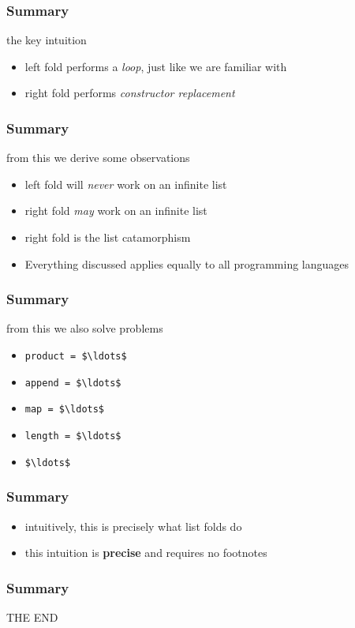 \begin{frame}
\frametitle{Summary}
\begin{block}{the key intuition}
\begin{itemize}
\item left fold performs a \emph{loop}, just like we are familiar with
\item right fold performs \emph{constructor replacement}
\end{itemize}
\end{block}
\end{frame}

\begin{frame}
\frametitle{Summary}
\begin{block}{from this we derive some observations}
\begin{itemize}
\item left fold will \emph{never} work on an infinite list
\item right fold \emph{may} work on an infinite list
\item right fold is the list catamorphism
\item Everything discussed applies equally to all programming languages
\end{itemize}
\end{block}
\end{frame}

\begin{frame}[fragile]
\frametitle{Summary}
\begin{block}{from this we also solve problems}
\begin{itemize}
\item \lstinline[mathescape]{product = $\ldots$}
\item \lstinline[mathescape]{append = $\ldots$}
\item \lstinline[mathescape]{map = $\ldots$}
\item \lstinline[mathescape]{length = $\ldots$}
\item \lstinline[mathescape]{$\ldots$}
\end{itemize}
\end{block}
\end{frame}

\begin{frame}
\frametitle{Summary}
\begin{block}{}
\begin{itemize}
\item intuitively, this is precisely what list folds do
\item this intuition is \textbf{precise} and requires no footnotes
\end{itemize}
\end{block}
\end{frame}

\begin{frame}
\frametitle{Summary}
\begin{center}
THE END
\end{center}
\end{frame}
